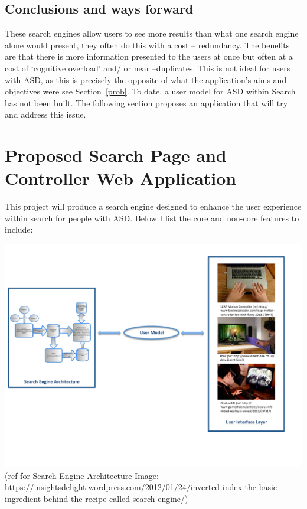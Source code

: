 \documentclass[10pt]{article}
\begin{document}
\subsection{Conclusions and ways forward}
These search engines allow users to see more results than what one search engine alone would present, they often do this with a cost -- redundancy. The benefits are that there is more information presented to the users at once but often at a cost of ‘cognitive overload’ and/ or near –duplicates. This is not ideal for users with ASD, as this is precisely the opposite of what the application's aims and objectives were see Section~\ref{prob}.
To date, a user model for ASD within Search has not been built. The following section proposes an application that will try and address this issue.


\section{Proposed Search Page and Controller Web Application}\label{proposed}
This project will produce a search engine designed to enhance the user experience within search for people with ASD. Below I list the core and non-core features to include:

\begin{center}
\includegraphics[scale=0.7]{searchEngArchi}\\
(ref for Search Engine Architecture Image: https://insightsdelight.wordpress.com/2012/01/24/inverted-index-the-basic-ingredient-behind-the-recipe-called-search-engine/)
\end{center}
\end{document}
